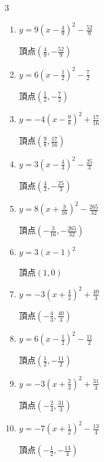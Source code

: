 \begin{multicols}{3}
\begin{enumerate}
  \item $\displaystyle y=9\left( x-\frac{4}{9}\right)^{2}-\frac{52}{9}$

        $\displaystyle 頂点\left( \frac{4}{9} , -\frac{52}{9} \right)$

  \item $\displaystyle y=6\left( x-\frac{1}{2}\right)^{2}-\frac{7}{2}$

        $\displaystyle 頂点\left( \frac{1}{2} , -\frac{7}{2} \right)$

  \item $\displaystyle y=-4\left( x-\frac{9}{8}\right)^{2}+\frac{17}{16}$

        $\displaystyle 頂点\left( \frac{9}{8} , \frac{17}{16} \right)$

  \item $\displaystyle y=3\left( x-\frac{4}{3}\right)^{2}-\frac{25}{3}$

        $\displaystyle 頂点\left( \frac{4}{3} , -\frac{25}{3} \right)$

  \item $\displaystyle y=8\left( x+\frac{3}{16}\right)^{2}-\frac{265}{32}$

        $\displaystyle 頂点\left( -\frac{3}{16} , -\frac{265}{32} \right)$

  \item $\displaystyle y=3\left( x-1\right)^{2}$

        $\displaystyle 頂点\left( 1 , 0 \right)$

  \item $\displaystyle y=-3\left( x+\frac{4}{3}\right)^{2}+\frac{40}{3}$

        $\displaystyle 頂点\left( -\frac{4}{3} , \frac{40}{3} \right)$

  \item $\displaystyle y=6\left( x-\frac{1}{2}\right)^{2}-\frac{11}{2}$

        $\displaystyle 頂点\left( \frac{1}{2} , -\frac{11}{2} \right)$

  \item $\displaystyle y=-3\left( x+\frac{2}{3}\right)^{2}+\frac{31}{3}$

        $\displaystyle 頂点\left( -\frac{2}{3} , \frac{31}{3} \right)$

  \item $\displaystyle y=-7\left( x+\frac{1}{2}\right)^{2}-\frac{13}{4}$

        $\displaystyle 頂点\left( -\frac{1}{2} , -\frac{13}{4} \right)$


\end{enumerate}
\end{multicols}
